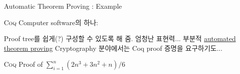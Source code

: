 \documentclass[../231120_msquare_computational-logic.tex]{subfiles}
\begin{document}
\begin{frame}{Automatic Theorem Proving : Example}
    \begin{exampleblock}{\textsc{Coq}}
        Computer software의 하나:
        \begin{itemize}
            \ii Proof tree를 쉽게(?) 구성할 수 있도록 해 줌.
            \ii 엄청난 표현력...
            \ii 부분적 \ul{automated theorem proving}
            \ii Cryptography 분야에서는 Coq proof 증명을 요구하기도...
        \end{itemize}
    \end{exampleblock}

    \begin{exampleblock}{\textsc{Coq} Proof of \(\sum_{i=1}^{n} (2n^3+3n^2+n)/6\)}
        \small
    \end{exampleblock}
\end{frame}
\end{document}
